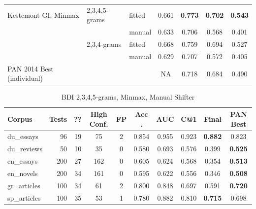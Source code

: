 \documentclass[
    hf
]{ceurart}
\begin{document}
\begin{table}
\begin{tabular}{lllcccc}
        Kestemont GI, Minmax       & 2,3,4,5-grams & fitted  & 0.661          & \textbf{ 0.773} & \textbf{0.702} & \textbf{0.543} \\
                                   &               & manual  & 0.633          & 0.706           & 0.568          & 0.401          \\
                                   & 2,3,4-grams   & fitted  & 0.668          & 0.759           & 0.694          & 0.527          \\
                                   &               & manual  & 0.629          & 0.707           & 0.572          & 0.405          \\
        PAN 2014 Best (individual) &               &         & NA             & 0.718           & 0.684          & 0.490          \\
        \bottomrule
    \end{tabular}
\end{table}

\begin{table}
    \caption{BDI 2,3,4,5-grams, Minmax, Manual Shifter}
    \label{tab:bdi}
    \raggedright
    \begin{tabular}{@{}lrrccccccc}
        \toprule
        Corpus       & Tests & ?? & High Conf. & FP & Acc  . & AUC   & C@1   & Final          & PAN Best       \\
        \midrule
        du\_essays   & 96    & 19 & 75         & 2  & 0.854  & 0.955 & 0.923 & \textbf{0.882} & 0.823          \\
        du\_reviews  & 50    & 10 & 35         & 0  & 0.580  & 0.693 & 0.576 & 0.399          & \textbf{0.525} \\
        en\_essays   & 200   & 27 & 162        & 0  & 0.605  & 0.624 & 0.568 & 0.354          & \textbf{0.513} \\
        en\_novels   & 200   & 34 & 161        & 0  & 0.595  & 0.622 & 0.556 & 0.346          & \textbf{0.508} \\
        gr\_articles & 100   & 34 & 61         & 2  & 0.800  & 0.848 & 0.697 & 0.591          & \textbf{0.720} \\
        sp\_articles & 100   & 35 & 53         & 1  & 0.780  & 0.882 & 0.810 & \textbf{0.715} & 0.698          \\
        \bottomrule
    \end{tabular}
\end{table}
\end{document}
